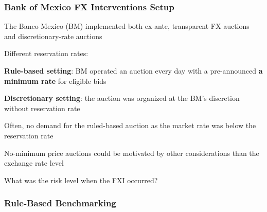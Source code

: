 \documentclass{beamer}
\newenvironment{largeitemize}{\itemize\addtolength{\itemsep}{10pt}}{\enditemize}
\begin{document}
\begin{frame}
  \frametitle{Bank of Mexico FX Interventions Setup}  
  \begin{largeitemize}
    \item The Banco Mexico (BM) implemented both ex-ante, transparent FX
      auctions and discretionary-rate auctions
    \item Different reservation rates:
      \begin{largeitemize}
      \item \textbf{Rule-based setting}: BM operated an auction every day
        with a pre-announced \textbf{a minimum rate} for eligible bids
      \item \textbf{Discretionary setting}: the auction was organized at the BM's discretion without reservation rate
      \end{largeitemize}
  \item Often, no demand for the ruled-based auction as the market rate was
    below the reservation rate
  \item No-minimum price auctions could be motivated by other considerations
    than the exchange rate level
  \item What was the risk level when the FXI occurred?
  \end{largeitemize}
\end{frame}


\begin{frame}
  \frametitle{Rule-Based Benchmarking}
\end{frame}
\end{document}
